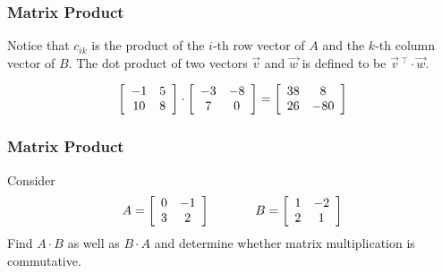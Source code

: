 \documentclass[xcolor=dvipsnames]{beamer}
\begin{document}
\begin{frame}
  \frametitle{Matrix Product}
  Notice that $c_{ik}$ is the product of the $i$-th row vector of $A$
  and the $k$-th column vector of $B$. The dot product of two vectors
  $\vec{v}$ and $\vec{w}$ is defined to be
  $\vec{v}\,^{\intercal}\cdot\vec{w}$.

\medskip

  \begin{equation}
    \label{eq:eroogaju}
    \left[
      \begin{array}{cc}
        -1 & 5 \\
        10 & 8 
      \end{array}\right]\cdot\left[
      \begin{array}{cc}
        -3 & -8 \\
        7 & 0
      \end{array}\right]=\left[
      \begin{array}{cc}
        38 & 8 \\
        26 & -80
      \end{array}\right]\notag
  \end{equation}
\end{frame}

\begin{frame}
  \frametitle{Matrix Product}
  {\ubung} Consider
  \begin{equation}
    \label{eq:tiequooh}
    A=\left[
      \begin{array}{cc}
        0 & -1 \\
        3 & 2
      \end{array}\right]\hspace{.5in}B=\left[
      \begin{array}{cc}
        1 & -2 \\
        2 & 1
      \end{array}\right]
  \end{equation}
Find $A\cdot{}B$ as well as $B\cdot{}A$ and determine whether matrix
multiplication is commutative.
\end{frame}
\end{document}
